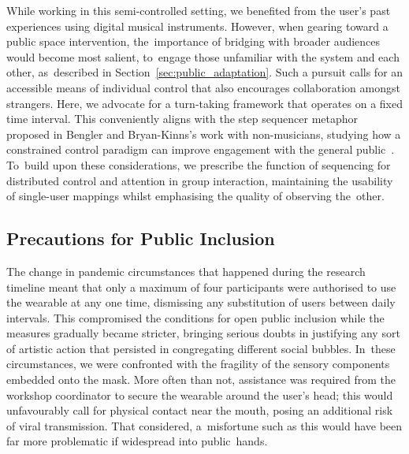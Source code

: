 While working in this semi-controlled setting, we benefited from the user's past experiences using digital musical instruments. However, when gearing toward a public space intervention, the~importance of bridging with broader audiences would become most salient, to~engage those unfamiliar with the system and each other, as~described in Section~\ref{sec:public_adaptation}. Such a pursuit calls for an accessible means of individual control that also encourages collaboration amongst strangers. Here, we advocate for a turn-taking framework that operates on a fixed time interval. This conveniently aligns with the step sequencer metaphor proposed in Bengler and Bryan-Kinns's work with non-musicians, studying how a constrained control paradigm can improve engagement with the general public~\cite{bengler_designing_2013}. To~build upon these considerations, we prescribe the function of sequencing for distributed control and attention in group interaction, maintaining the usability of single-user mappings whilst emphasising the quality of observing the~other.

\subsection*{Precautions for Public Inclusion}

The change in pandemic circumstances that happened during the research timeline meant that only a maximum of four participants were authorised to use the wearable at any one time, dismissing any substitution of users between daily intervals. This compromised the conditions for open public inclusion while the measures gradually became stricter, bringing serious doubts in justifying any sort of artistic action that persisted in congregating different social bubbles. In~these circumstances, we were confronted with the fragility of the sensory components embedded onto the mask. More often than not, assistance was required from the workshop coordinator to secure the wearable around the user's head; this would unfavourably call for physical contact near the mouth, posing an additional risk of viral transmission. That considered, a~misfortune such as this would have been far more problematic if widespread into public~hands.

